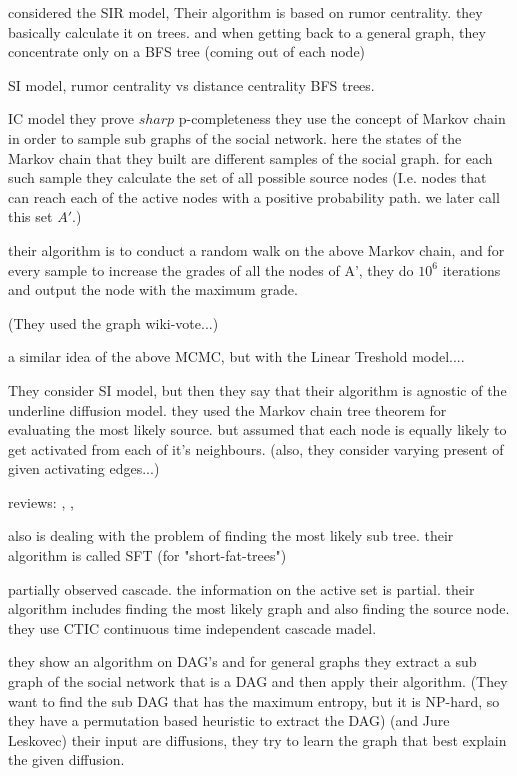 \documentclass[sigconf,anonymous]{aamas}
\begin{document}
\cite{shah2010detecting}
considered the SIR model, 
Their algorithm is based on rumor centrality. they basically calculate it on trees. and when getting back to a general graph, they concentrate only on a BFS tree (coming out of each node)

\cite{shah2011rumors}
SI model, rumor centrality vs distance centrality
BFS trees.

\cite{zhai2015cascade}
IC model
they prove $sharp$ p-completeness %
they use the concept of Markov chain in order to sample sub graphs of the social network. here the states of the Markov chain that they built are different samples of the social graph. for each such sample they calculate the set of all possible source nodes (I.e. nodes that can reach each of the active nodes with a positive probability path. we later call this set $A'$.)

their algorithm is to conduct a random walk on the above Markov chain, and for every sample to increase the grades of all the nodes of A', they do $10^6$ iterations and output the node with the maximum grade.

(They used the graph wiki-vote...)

\cite{zhang2017markov}
a similar idea of the above MCMC, but with the Linear Treshold model....

\cite{kumar2017temporally} 
They consider SI model, but then they say that their algorithm is agnostic of the underline diffusion model.
they used the Markov chain tree theorem for evaluating the most likely source. but assumed that each node is equally likely to get activated from each of it's neighbours. (also, they consider varying present of given activating edges...)

reviews: \cite{shelke2019source}, \cite{jiang2016identifying}, \cite{jin2021schemes}

\cite{zhu2015source} also is dealing with the problem of finding the most likely sub tree. their algorithm is called SFT (for "short-fat-trees")

\cite{farajtabar2015back} partially observed cascade. the information on the active set is partial. their algorithm includes finding the most likely graph and also finding the source node.
they use CTIC continuous time independent cascade madel.

\cite{tong2016effector}
they show an algorithm on DAG's and for general graphs they extract a sub graph of the social network that is a DAG and then apply their algorithm.
(They want to find the sub DAG that has the maximum entropy, but it is NP-hard, so they have a permutation based heuristic to extract the DAG)
\cite{gomez2012inferring} (and Jure Leskovec)
their input are diffusions, they try to learn the graph that best explain the given diffusion. 
\end{document}
